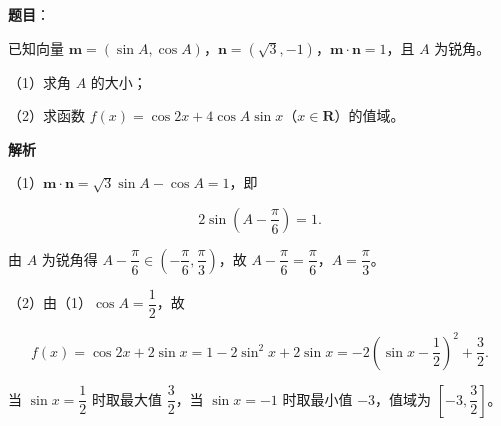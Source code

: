 \begin{answer}

\textbf{题目}：

已知向量 $\boldsymbol m=(\sin A,\cos A)$，$\boldsymbol n=(\sqrt3,-1)$，$\boldsymbol m\cdot\boldsymbol n=1$，且 $A$ 为锐角。

（1）求角 $A$ 的大小；

（2）求函数 $f(x)=\cos 2x+4\cos A\sin x$（$x\in\mathbf R$）的值域。

\textbf{解析}

（1）$\boldsymbol m\cdot\boldsymbol n=\sqrt3\sin A-\cos A=1$，即

\nopagebreak[4]
\[2\sin\left(A-\frac{\pi}6\right)=1.\]

由 $A$ 为锐角得 $A-\dfrac{\pi}6\in\left(-\dfrac{\pi}6,\dfrac{\pi}3\right)$，故 $A-\dfrac{\pi}6=\dfrac{\pi}6$，$A=\dfrac{\pi}3$。

（2）由（1）$\cos A=\dfrac12$，故

\nopagebreak[4]
\[f(x)=\cos2x+2\sin x=1-2\sin^2x+2\sin x=-2\left(\sin x-\frac12\right)^2+\frac32.\]

当 $\sin x=\dfrac12$ 时取最大值 $\dfrac32$，当 $\sin x=-1$ 时取最小值 $-3$，值域为 $\left[-3,\dfrac32\right]$。


\end{answer}
